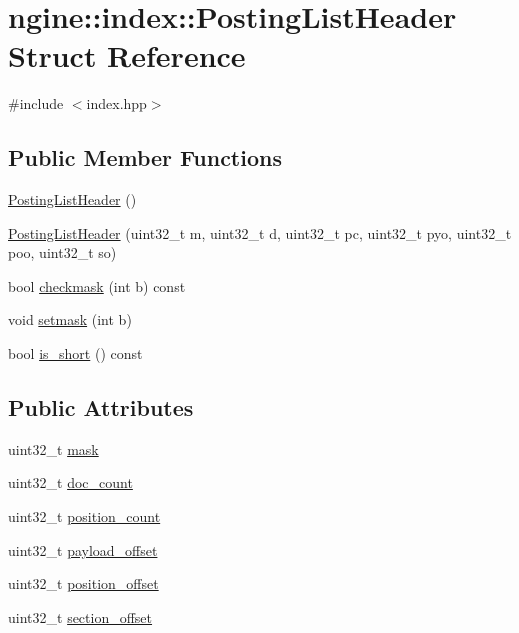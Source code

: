\hypertarget{structngine_1_1index_1_1PostingListHeader}{}\section{ngine\+:\+:index\+:\+:Posting\+List\+Header Struct Reference}
\label{structngine_1_1index_1_1PostingListHeader}


{\ttfamily \#include $<$index.\+hpp$>$}

\subsection*{Public Member Functions}
\begin{DoxyCompactItemize}
\item 
\hyperlink{structngine_1_1index_1_1PostingListHeader_ad1e839261dc4531fdbc232b5ed514f2f}{Posting\+List\+Header} ()
\item 
\hyperlink{structngine_1_1index_1_1PostingListHeader_a3c19aa0fd1e0fd3319fa7519b27ed09f}{Posting\+List\+Header} (uint32\+\_\+t m, uint32\+\_\+t d, uint32\+\_\+t pc, uint32\+\_\+t pyo, uint32\+\_\+t poo, uint32\+\_\+t so)
\item 
bool \hyperlink{structngine_1_1index_1_1PostingListHeader_a9f7abde567f1c05f3065826bab874635}{checkmask} (int b) const
\item 
void \hyperlink{structngine_1_1index_1_1PostingListHeader_a0889a71e78026f6c5bb8056fed11d04a}{setmask} (int b)
\item 
bool \hyperlink{structngine_1_1index_1_1PostingListHeader_ace2fd092dc0c1b973187159ff31502e0}{is\+\_\+short} () const
\end{DoxyCompactItemize}
\subsection*{Public Attributes}
\begin{DoxyCompactItemize}
\item 
uint32\+\_\+t \hyperlink{structngine_1_1index_1_1PostingListHeader_ac0b8553a10a36b56e37be19717a19df1}{mask}
\item 
uint32\+\_\+t \hyperlink{structngine_1_1index_1_1PostingListHeader_a0544323406e816e99deba90b414b9d1c}{doc\+\_\+count}
\item 
uint32\+\_\+t \hyperlink{structngine_1_1index_1_1PostingListHeader_ac1ff428586a9329a74b721f2e8f160b7}{position\+\_\+count}
\item 
uint32\+\_\+t \hyperlink{structngine_1_1index_1_1PostingListHeader_a8ed36d2de3aebd08243a9cb458a9bcd6}{payload\+\_\+offset}
\item 
uint32\+\_\+t \hyperlink{structngine_1_1index_1_1PostingListHeader_af26284f78faeb6954544c4537839dddf}{position\+\_\+offset}
\item 
uint32\+\_\+t \hyperlink{structngine_1_1index_1_1PostingListHeader_a0979a1e2c7f78358bfc3e243ef2ebd19}{section\+\_\+offset}
\end{DoxyCompactItemize}



